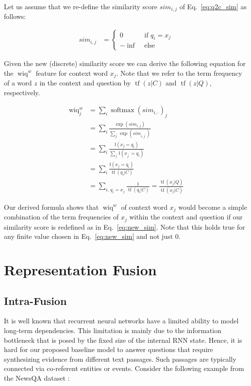 \documentclass[11pt,a4paper]{article}
\begin{document}
Let us assume that we re-define the similarity score $sim_{i,j}$ of Eq.~\ref{eq:q2c_sim} as follows:

\begin{align}
    sim_{i,j} &= \begin{cases} 0 & \text{ if } q_i = x_j \\ -\inf & \text{ else}  \end{cases} \label{eq:new_sim}
\end{align}

Given the new (discrete) similarity score we can derive the following equation for the $\operatorname{wiq}^w$ feature for context word $x_j$. Note that we refer to the term frequency of a word $z$ in the context and question by $\operatorname{tf}(z|C)$ and $\operatorname{tf}(z|Q)$, respectively.

\begin{align*}
    \operatorname{wiq}^w_j &= \sum_i \operatorname{softmax}( sim_{i,\cdot} )_j \\
                           &= \sum_i \frac{\exp(sim_{i,j})}{\sum_{j^\prime} \exp(sim_{i,j^\prime})} \\
                           &= \sum_i \frac{\mathbb{I}(x_j = q_i)}{\sum_{j^\prime} \mathbb{I}(x_{j^\prime} = q_i)} \\
                           &= \sum_i \frac{\mathbb{I}(x_j = q_i)}{\operatorname{tf}(q_i|C)}  \\
                           &= \sum_{i,\, q_i=x_j} \frac{1}{\operatorname{tf}(q_i|C)} = \frac{\operatorname{tf}(x_j|Q)}{\operatorname{tf}(x_j|C)}
\end{align*}

Our derived formula shows that $\operatorname{wiq}^w$ of context word $x_j$ would become a simple combination of the term frequencies of $x_j$ within the context and question if our similarity score is redefined as in Eq.~\ref{eq:new_sim}. Note that this holds true for any finite value chosen in Eq.~\ref{eq:new_sim} and not just $0$.

\section{Representation Fusion}\label{sec:rep_fusion}
\subsection{Intra-Fusion}
It is well known that recurrent neural networks have a limited ability to model long-term dependencies. This limitation is mainly due to the information bottleneck that is posed by the fixed size of the internal RNN state. Hence, it is hard for our proposed baseline model to answer questions that require synthesizing evidence from different text passages. Such passages are typically connected via co-referent entities or events. Consider the following example from the NewsQA dataset \cite{Trischler2017}:
\end{document}
